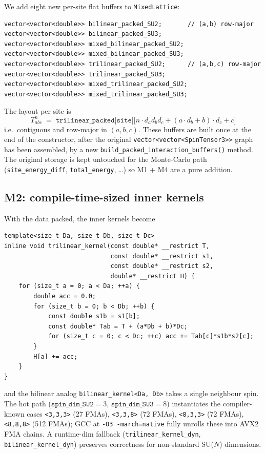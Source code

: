 \documentclass[11pt,letterpaper]{article}
\begin{document}
We add eight new per-site flat buffers to \texttt{MixedLattice}:
\begin{verbatim}
vector<vector<double>> bilinear_packed_SU2;       // (a,b) row-major
vector<vector<double>> bilinear_packed_SU3;
vector<vector<double>> mixed_bilinear_packed_SU2;
vector<vector<double>> mixed_bilinear_packed_SU3;
vector<vector<double>> trilinear_packed_SU2;      // (a,b,c) row-major
vector<vector<double>> trilinear_packed_SU3;
vector<vector<double>> mixed_trilinear_packed_SU2;
vector<vector<double>> mixed_trilinear_packed_SU3;
\end{verbatim}
The layout per site is
\[
  T^{n}_{abc}
  \;=\;
  \texttt{trilinear\_packed[site]}
  \bigl[
    n \cdot d_a d_b d_c
    + (a \cdot d_b + b) \cdot d_c
    + c
  \bigr]
\]
i.e.~contiguous and row-major in $(a,b,c)$.  These buffers are built
once at the end of the constructor, after the original
\texttt{vector<vector<SpinTensor3>>} graph has been assembled, by a
new \texttt{build\_packed\_interaction\_buffers()} method.  The
original storage is kept untouched for the Monte-Carlo path
(\texttt{site\_energy\_diff}, \texttt{total\_energy}, \dots) so M1 +
M4 are a pure addition.

\subsection{M2: compile-time-sized inner kernels}

With the data packed, the inner kernels become
\begin{verbatim}
template<size_t Da, size_t Db, size_t Dc>
inline void trilinear_kernel(const double* __restrict T,
                             const double* __restrict s1,
                             const double* __restrict s2,
                             double* __restrict H) {
    for (size_t a = 0; a < Da; ++a) {
        double acc = 0.0;
        for (size_t b = 0; b < Db; ++b) {
            const double s1b = s1[b];
            const double* Tab = T + (a*Db + b)*Dc;
            for (size_t c = 0; c < Dc; ++c) acc += Tab[c]*s1b*s2[c];
        }
        H[a] += acc;
    }
}
\end{verbatim}
and the bilinear analog \texttt{bilinear\_kernel<Da, Db>} takes a
single neighbour spin.  The hot path
($\texttt{spin\_dim\_SU2} = 3$, $\texttt{spin\_dim\_SU3} = 8$)
instantiates the compiler-known cases
\texttt{<3,3,3>} (27 FMAs), \texttt{<3,3,8>} (72 FMAs),
\texttt{<8,3,3>} (72 FMAs), \texttt{<8,8,8>} (512 FMAs);
GCC at \texttt{-O3 -march=native} fully unrolls these into AVX2 FMA
chains.  A runtime-dim fallback (\texttt{trilinear\_kernel\_dyn},
\texttt{bilinear\_kernel\_dyn}) preserves correctness for
non-standard SU($N$) dimensions.
\end{document}
